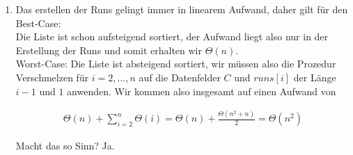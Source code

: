 \begin{solution}
\begin{enumerate}[label = (\alph*)]
    \item Das erstellen der Runs gelingt immer in linearem Aufwand, daher gilt für den Best-Case: \\
    Die Liste ist schon aufsteigend sortiert, der Aufwand liegt also nur in der Erstellung der Runs und somit erhalten wir $\Theta(n)$. \\

    Worst-Case: Die Liste ist absteigend sortiert, wir müssen also die Prozedur Verschmelzen für $i = 2,\dots,n$ auf die Datenfelder $C$ und $runs[i]$ der Länge $i-1$ und $1$ anwenden. Wir kommen also insgesamt auf einen Aufwand von

    \begin{align*}
      \Theta(n) + \sum_{i=2}^{n} \Theta(i) = \Theta(n) + \frac{\Theta(n^2+n)}{2} = \Theta(n^2)
    \end{align*}

    Macht das so Sinn? Ja.

\end{enumerate}
\end{solution}




